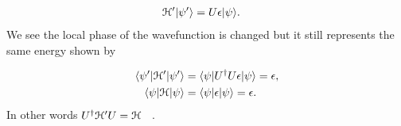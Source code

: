 \begin{align}
  \mathcal{H}' |\psi'\rangle &= U \epsilon |\psi\rangle.
\end{align}
We see the local phase of the wavefunction is changed but it still represents the same energy shown by

\begin{align}
  \langle \psi'| \mathcal{H}' |\psi'\rangle &= \langle \psi | U^{\dagger} U \epsilon |\psi \rangle = \epsilon, \nonumber \\
  \langle \psi | \mathcal{H} |\psi \rangle &= \langle \psi | \epsilon |\psi \rangle = \epsilon. \end{align}
In other words
$U^{\dagger} \mathcal{H}' U = \mathcal{H}$  ~\cite{kittelIntroductionSolidState2018}.
